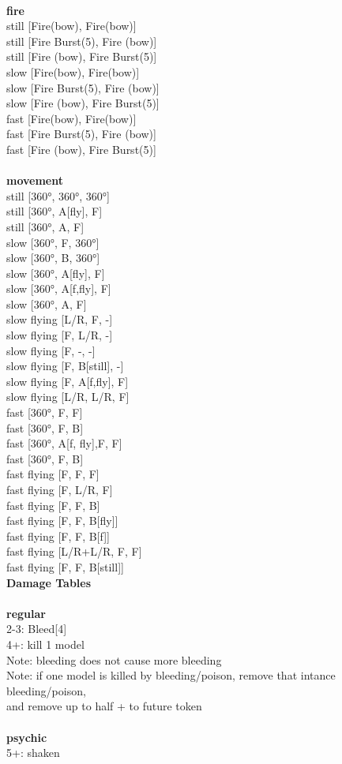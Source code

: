 \ \\ {\bf fire } \\
still [Fire(bow), Fire(bow)] \\
still [Fire Burst(5), Fire (bow)] \\
still [Fire (bow), Fire Burst(5)] \\
slow [Fire(bow), Fire(bow)] \\
slow [Fire Burst(5), Fire (bow)] \\
slow [Fire (bow), Fire Burst(5)] \\
fast [Fire(bow), Fire(bow)] \\
fast [Fire Burst(5), Fire (bow)] \\
fast [Fire (bow), Fire Burst(5)] \\
\ \\ {\bf movement } \\
still [360°, 360°, 360°] \\
still [360°, A[fly], F] \\
still [360°, A, F] \\
slow [360°, F, 360°] \\
slow [360°, B, 360°] \\
slow [360°, A[fly], F] \\
slow [360°, A[f,fly], F] \\
slow [360°, A, F] \\
slow flying [L/R, F, -] \\
slow flying [F, L/R, -] \\
slow flying [F, -, -] \\
slow flying [F, B[still], -] \\
slow flying [F, A[f,fly], F] \\
slow flying [L/R, L/R, F] \\
fast [360°, F, F] \\
fast [360°, F, B] \\
fast [360°, A[f, fly],F, F] \\
fast [360°, F, B] \\
fast flying [F, F, F] \\
fast flying [F, L/R, F] \\
fast flying [F, F, B] \\
fast flying [F, F, B[fly]] \\
fast flying [F, F, B[f]] \\
fast flying [L/R+L/R, F, F] \\
fast flying [F, F, B[still]] \\


{\bf Damage Tables} \\
\ \\ {\bf regular } \\
2-3: Bleed[4] \\
4+: kill 1 model \\
Note: bleeding does not cause more bleeding \\
Note: if one model is killed by bleeding/poison, remove that intance bleeding/poison, \\ and remove up to half + to future token \\
\ \\ {\bf psychic } \\
5+: shaken \\


